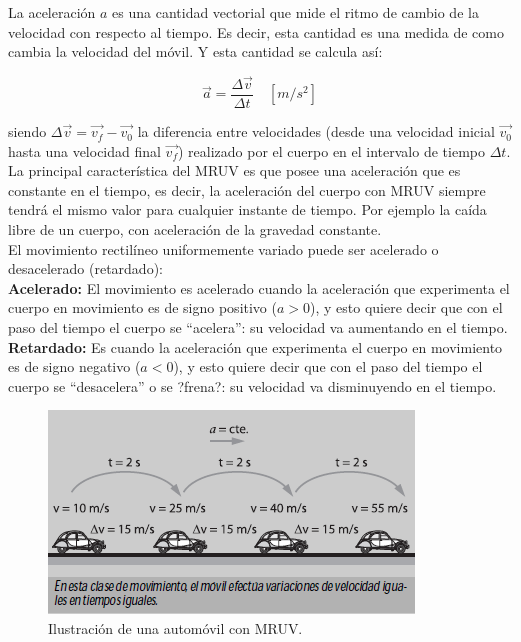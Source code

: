 \documentclass[a5paper,pagesize,10pt,bibtotoc,pointlessnumbers,
normalheadings,DIV=9,fleqn,x11names,table,twoside=false]{scrbook}
\begin{document}
La aceleración $a$ es una cantidad vectorial que mide el ritmo de cambio de la velocidad con respecto al tiempo. Es decir, esta 
cantidad es una medida de como cambia la velocidad del móvil. Y esta cantidad se calcula así:

\begin{equation}
 \vec{a}=\frac{\Delta \vec{v}}{\Delta t}\quad [m/s^2] 
 \end{equation}
 
siendo $\Delta \vec{v}=\vec{v_f}-\vec{v_0}$ la diferencia entre velocidades (desde una velocidad inicial $\vec{v_0}$ hasta una 
velocidad final $\vec{v_f}$) realizado por el cuerpo en el intervalo de tiempo $\Delta t$.\\

La principal característica del MRUV es que posee una aceleración que es constante en el tiempo, es decir, la aceleración del 
cuerpo con MRUV siempre tendrá el mismo valor para cualquier instante de tiempo. Por ejemplo la caída libre de un cuerpo, con 
aceleración de la gravedad constante.\\

El movimiento rectilíneo uniformemente variado puede ser acelerado o desacelerado (retardado):\\

\textbf{Acelerado:} El movimiento es acelerado cuando la aceleración que experimenta el cuerpo en movimiento es de signo positivo 
($a > 0$), y esto quiere decir que con el paso del tiempo el cuerpo se ``acelera'': su velocidad va aumentando en el tiempo.\\

\textbf{Retardado:} Es cuando la aceleración que experimenta el cuerpo en movimiento es de signo negativo ($a < 0$), y esto 
quiere decir que con el paso del tiempo el cuerpo se ``desacelera'' o se ?frena?: su velocidad va disminuyendo en el tiempo.\\

\begin{figure}[ht]
 \centering
 \includegraphics[scale=0.7]{images/mruv.png}
 \caption{Ilustración de una automóvil con MRUV.}\label{mruv}
\end{figure} 
\end{document}
